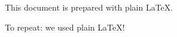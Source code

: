 \documentclass{article}
\newcommand{\pythononly}[1]{} %
\newcommand{\latexonly}[1]{#1}
\begin{document}
\pythononly
{%
: This document is prepared with \empy{latex.py}.
}%

\latexonly%
{
This document is prepared with plain \LaTeX.
}

\newcommand{\textprocessor}{plain \LaTeX}
To repeat: we used \textprocessor!
\end{document}
